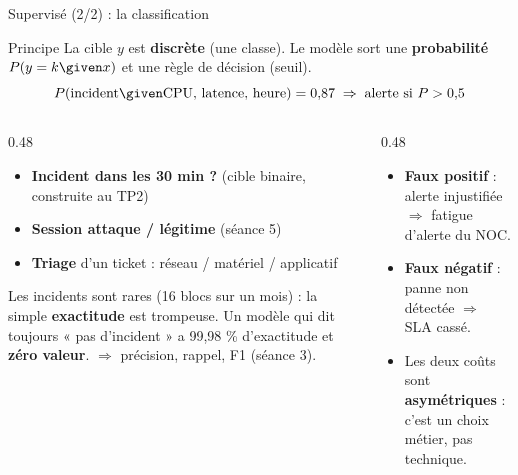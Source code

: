 \begin{frame}{Supervisé (2/2) : la classification}
\begin{block}{Principe}
La cible $y$ est \textbf{discrète} (une classe). Le modèle sort une \textbf{probabilité}
$P(y = k \given x)$ et une règle de décision (seuil).
\[
P(\text{incident} \given \text{CPU, latence, heure}) = 0{,}87
\;\Rightarrow\; \text{alerte si } P > 0{,}5
\]
\end{block}
\begin{columns}[t]
\begin{column}{0.48\textwidth}
\begin{ebox}
\begin{itemize}
\item \textbf{Incident dans les 30 min ?} (cible binaire, construite au TP2)
\item \textbf{Session attaque / légitime} (séance 5)
\item \textbf{Triage} d'un ticket : réseau / matériel / applicatif
\end{itemize}
\end{ebox}
\begin{wbox}
Les incidents sont rares (16 blocs sur un mois) : la simple
\textbf{exactitude} est trompeuse. Un modèle qui dit toujours
« pas d'incident » a 99,98 \% d'exactitude et \textbf{zéro valeur}.
$\Rightarrow$ précision, rappel, F1 (séance 3).
\end{wbox}
\end{column}
\begin{column}{0.48\textwidth}
\begin{kbox}
\begin{itemize}
\item \textbf{Faux positif} : alerte injustifiée $\Rightarrow$ fatigue d'alerte du NOC.
\item \textbf{Faux négatif} : panne non détectée $\Rightarrow$ SLA cassé.
\item Les deux coûts sont \textbf{asymétriques} : c'est un choix métier, pas technique.
\end{itemize}
\end{kbox}
\end{column}
\end{columns}
\end{frame}

